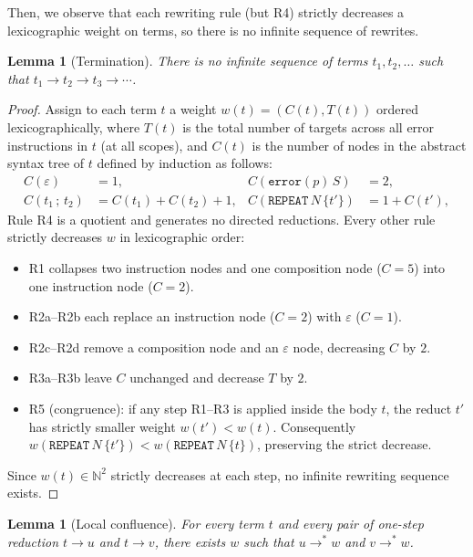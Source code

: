 \documentclass[11pt,a4paper]{article}
\newtheorem{lemma}[theorem]{Lemma}
\newcommand{\tostep}{\to}
\newcommand{\tomany}{\to^{*}}
\begin{document}
Then, we observe that each rewriting rule (but R4) strictly decreases a lexicographic weight on terms, so there is no infinite sequence of rewrites. 

\begin{lemma}[Termination]
\label{lem:termination}
There is no infinite sequence of terms $t_1, t_2, \ldots$ such that $t_1 \tostep t_2 \tostep t_3 \tostep \cdots$.
\end{lemma}

\begin{proof}
Assign to each term $t$ a weight $w(t) = (C(t), T(t))$ ordered lexicographically, where $T(t)$ is the total number of targets across all error instructions in $t$ (at all scopes), and $C(t)$ is the number of nodes in the abstract syntax tree of $t$ defined by induction as follows:
\begin{align*}
  C(\varepsilon) &= 1, &
  C(\mathtt{error}(p)\,S) &= 2, \\
  C(t_1\,;\,t_2) &= C(t_1)+C(t_2)+1, &
  C(\mathtt{REPEAT}\,N\,\{t'\}) &= 1+C(t'),
\end{align*}
Rule R4 is a quotient and generates no directed reductions. Every other rule strictly decreases $w$ in lexicographic order:
\begin{itemize}
  \item R1 collapses two instruction nodes and one composition node ($C = 5$) into one instruction node ($C = 2$).
  \item R2a--R2b each replace an instruction node ($C = 2$) with $\varepsilon$ ($C = 1$).
  \item R2c--R2d remove a composition node and an $\varepsilon$ node, decreasing $C$ by $2$.
  \item R3a--R3b leave $C$ unchanged and decrease $T$ by $2$.
  \item R5 (congruence): if any step R1--R3 is applied inside the body $t$, the reduct $t'$ has strictly smaller weight $w(t') < w(t)$. Consequently $w(\mathtt{REPEAT}\,N\,\{t'\}) < w(\mathtt{REPEAT}\,N\,\{t\})$, preserving the strict decrease.
\end{itemize}
Since $w(t) \in \mathbb{N}^2$ strictly decreases at each step, no infinite rewriting sequence exists.
\end{proof}

\begin{lemma}[Local confluence]
\label{lem:local-confluence}
For every term $t$ and every pair of one-step reduction $t \tostep u$ and $t \tostep v$, there exists 
$w$ such that $u \tomany w$ and $v \tomany w$.
\end{lemma}
\end{document}
